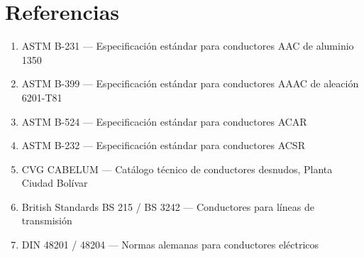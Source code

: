\documentclass[12pt,a4paper]{article}
\begin{document}
\section{Referencias}

\begin{enumerate}
    \item ASTM B-231 --- Especificación estándar para conductores AAC de aluminio 1350
    \item ASTM B-399 --- Especificación estándar para conductores AAAC de aleación 6201-T81
    \item ASTM B-524 --- Especificación estándar para conductores ACAR
    \item ASTM B-232 --- Especificación estándar para conductores ACSR
    \item CVG CABELUM --- Catálogo técnico de conductores desnudos, Planta Ciudad Bolívar
    \item British Standards BS 215 / BS 3242 --- Conductores para líneas de transmisión
    \item DIN 48201 / 48204 --- Normas alemanas para conductores eléctricos
\end{enumerate}
\end{document}

